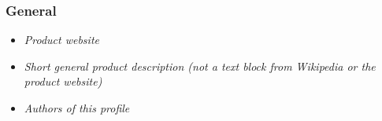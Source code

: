 
\begin{frame}
\frametitle{General}
\begin{itemize}
\item \emph{Product website}
\item \emph{Short general product description (not a text block from Wikipedia or the product website)}
\item \emph{Authors of this profile}
\end{itemize}
\end{frame} 